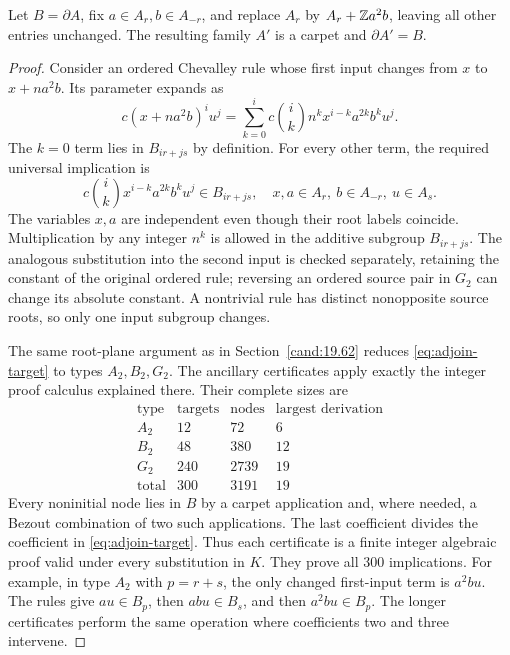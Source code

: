 \begin{lemma}
Let \(B=\partial A\), fix \(a\in A_r,b\in A_{-r}\), and replace
\(A_r\) by \(A_r+\mathbb Z a^2b\), leaving all other entries unchanged.
The resulting family \(A'\) is a carpet and \(\partial A'=B\).
\end{lemma}
\begin{proof}
Consider an ordered Chevalley rule whose first input changes from
\(x\) to \(x+na^2b\). Its parameter expands as
\[
 c(x+na^2b)^iu^j
   =\sum_{k=0}^i c\binom ik n^k x^{i-k}a^{2k}b^ku^j.
\]
The \(k=0\) term lies in \(B_{ir+js}\) by definition. For every
other term, the required universal implication is
\begin{equation}
 c\binom ik x^{i-k}a^{2k}b^ku^j\in B_{ir+js},
 \quad x,a\in A_r,\ b\in A_{-r},\ u\in A_s.
 \label{eq:adjoin-target}
\end{equation}
The variables \(x,a\) are independent even though their root
labels coincide. Multiplication by any integer \(n^k\) is allowed
in the additive subgroup \(B_{ir+js}\).
The analogous substitution into the second input is checked
separately, retaining the constant of the original ordered rule;
reversing an ordered source pair in \(G_2\) can change its absolute
constant. A nontrivial rule has distinct nonopposite source roots,
so only one input subgroup changes.

The same root-plane argument as in Section~\ref{cand:19.62}
reduces \eqref{eq:adjoin-target} to types \(A_2,B_2,G_2\).
The ancillary certificates apply exactly the integer proof
calculus explained there. Their complete sizes are
\[
\begin{array}{c|rrr}
 \text{type}&\text{targets}&\text{nodes}&\text{largest derivation}\\ \hline
 A_2&12&72&6\\
 B_2&48&380&12\\
 G_2&240&2739&19\\ \hline
 \text{total}&300&3191&19
\end{array}
\]
Every noninitial node lies in \(B\) by a carpet application and,
where needed, a Bezout combination of two such applications.
The last coefficient divides the coefficient in
\eqref{eq:adjoin-target}. Thus each certificate is a finite
integer algebraic proof valid under every substitution in \(K\).
They prove all 300 implications. For example, in type \(A_2\)
with \(p=r+s\), the only changed first-input term is \(a^2bu\).
The rules give \(au\in B_p\), then \(abu\in B_s\), and then
\(a^2bu\in B_p\). The longer certificates perform the same
operation where coefficients two and three intervene.


\end{proof}
